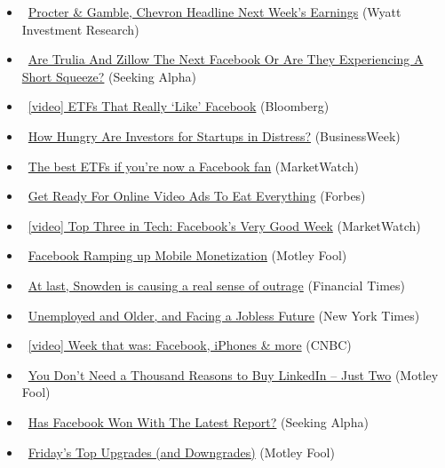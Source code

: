 \documentclass[11pt,asymmetric]{article}
\begin{document}
\begin{itemize}
\item\ \href{http://finance.yahoo.com/news/procter-gamble-chevron-headline-next-202106917.html}{Procter \& Gamble, Chevron Headline Next Week’s Earnings} (Wyatt Investment Research)
\item\ \href{http://seekingalpha.com/article/1577412-are-trulia-and-zillow-the-next-facebook-or-are-they-experiencing-a-short-squeeze?source=yahoo}{Are Trulia And Zillow The Next Facebook Or Are They Experiencing A Short Squeeze?} (Seeking Alpha)
\item\ \href{http://www.bloomberg.com/video/etfs-that-really-like-facebook-DJsP54dcRL66yMA_kUC9vg.html?cmpid=yhoo}{[video] ETFs That Really `Like' Facebook} (Bloomberg)
\item\ \href{http://www.businessweek.com/articles/2013-07-26/how-hungry-are-investors-for-startups-in-distress?campaign_id=yhoo}{How Hungry Are Investors for Startups in Distress?} (BusinessWeek)
\item\ \href{http://www.marketwatch.com/News/Story/Story.aspx?guid=31604424-C2D4-D575-4454-C4C422D21A38&siteid=yhoof2}{The best ETFs if you're now a Facebook fan} (MarketWatch)
\item\ \href{http://www.forbes.com/sites/erikamorphy/2013/07/26/get-ready-for-online-video-ads-to-eat-everything/?partner=yahootix}{Get Ready For Online Video Ads To Eat Everything} (Forbes)
\item\ \href{http://www.marketwatch.com/News/Story/Story.aspx?guid=302AA3C4-3E74-429D-8BE1-F58A2DAF57B5&siteid=yhoof2}{[video] Top Three in Tech: Facebook's Very Good Week} (MarketWatch)
\item\ \href{http://beta.fool.com/dujames/2013/07/26/facebook-ramping-up-mobile-monetization/41642/?source=eogyholnk0000001}{Facebook Ramping up Mobile Monetization} (Motley Fool)
\item\ \href{http://www.ft.com/cms/s/a9cb2196-f517-11e2-b4f8-00144feabdc0,s01=1.html}{At last, Snowden is causing a real sense of outrage} (Financial Times)
\item\ \href{http://www.nytimes.com/2013/07/27/your-money/unemployed-and-older-and-facing-a-jobless-future.html?partner=yahoofinance}{Unemployed and Older, and Facing a Jobless Future} (New York Times)
\item\ \href{http://video.cnbc.com/gallery/?video=3000186128&__source=yahoo%7Cheadline%7Cquote%7Cvideo%7C&par=yahoo}{[video] Week that was: Facebook, iPhones \& more} (CNBC)
\item\ \href{http://beta.fool.com/yieke/2013/07/26/you-dont-need-a-thousand-reasons-to-buy-linkedin-j/41334/?source=eogyholnk0000001}{You Don’t Need a Thousand Reasons to Buy LinkedIn – Just Two} (Motley Fool)
\item\ \href{http://seekingalpha.com/article/1576652-has-facebook-won-with-the-latest-report?source=yahoo}{Has Facebook Won With The Latest Report?} (Seeking Alpha)
\item\ \href{http://finance.yahoo.com/news/fridays-top-upgrades-downgrades-180138511.html}{Friday's Top Upgrades (and Downgrades)} (Motley Fool)
\end{itemize}
\end{document}
